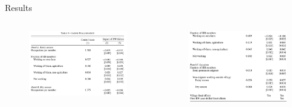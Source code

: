 \documentclass[10pt]{beamer}
\begin{document}
\begin{frame}
	{Results}
	\begin{columns}
		\begin{column}{0.5\textwidth}
			\begin{figure}
				\centering
				\includegraphics[width=1\textwidth]{table4_a.png}
			\end{figure}
		\end{column}
		\begin{column}{0.5\textwidth}
			\begin{figure}
				\centering
				\includegraphics[width=1\textwidth]{table4_b.png}
			\end{figure}
		\end{column}
	\end{columns}
\end{frame}
\end{document}
